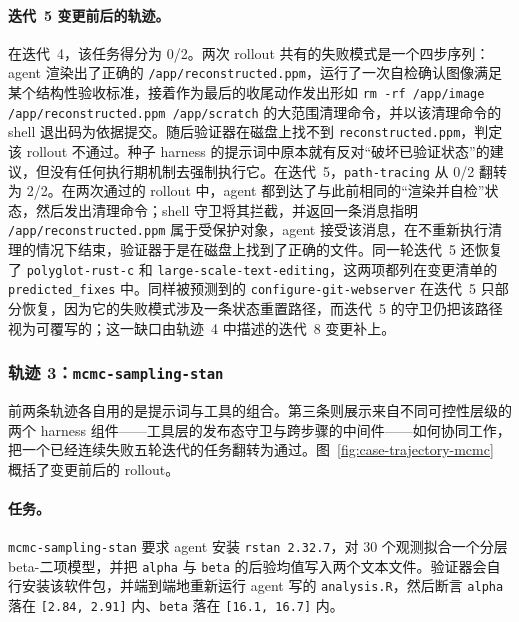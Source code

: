 \paragraph{迭代~5 变更前后的轨迹。}
在迭代~4，该任务得分为 0/2。两次 rollout 共有的失败模式是一个四步序列：agent 渲染出了正确的 \texttt{/app/reconstructed.ppm}，运行了一次自检确认图像满足某个结构性验收标准，接着作为最后的收尾动作发出形如 \texttt{rm -rf /app/image /app/reconstructed.ppm /app/scratch} 的大范围清理命令，并以该清理命令的 shell 退出码为依据提交。随后验证器在磁盘上找不到 \texttt{reconstructed.ppm}，判定该 rollout 不通过。种子 harness 的提示词中原本就有反对“破坏已验证状态”的建议，但没有任何执行期机制去强制执行它。在迭代~5，\texttt{path-tracing} 从 0/2 翻转为 2/2。在两次通过的 rollout 中，agent 都到达了与此前相同的“渲染并自检”状态，然后发出清理命令；shell 守卫将其拦截，并返回一条消息指明 \texttt{/app/reconstructed.ppm} 属于受保护对象，agent 接受该消息，在不重新执行清理的情况下结束，验证器于是在磁盘上找到了正确的文件。同一轮迭代~5 还恢复了 \texttt{polyglot-rust-c} 和 \texttt{large-scale-text-editing}，这两项都列在变更清单的 \texttt{predicted\_fixes} 中。同样被预测到的 \texttt{configure-git-webserver} 在迭代~5 只部分恢复，因为它的失败模式涉及一条状态重置路径，而迭代~5 的守卫仍把该路径视为可覆写的；这一缺口由轨迹~4 中描述的迭代~8 变更补上。

\subsubsection{轨迹 3：\texttt{mcmc-sampling-stan}}
\label{app:case-study:mcmc}

前两条轨迹各自用的是提示词与工具的组合。第三条则展示来自不同可控性层级的两个 harness 组件——工具层的发布态守卫与跨步骤的中间件——如何协同工作，把一个已经连续失败五轮迭代的任务翻转为通过。图~\ref{fig:case-trajectory-mcmc} 概括了变更前后的 rollout。

\paragraph{任务。}
\texttt{mcmc-sampling-stan} 要求 agent 安装 \texttt{rstan 2.32.7}，对 30 个观测拟合一个分层 beta-二项模型，并把 \texttt{alpha} 与 \texttt{beta} 的后验均值写入两个文本文件。验证器会自行安装该软件包，并端到端地重新运行 agent 写的 \texttt{analysis.R}，然后断言 \texttt{alpha} 落在 \texttt{[2.84, 2.91]} 内、\texttt{beta} 落在 \texttt{[16.1, 16.7]} 内。

